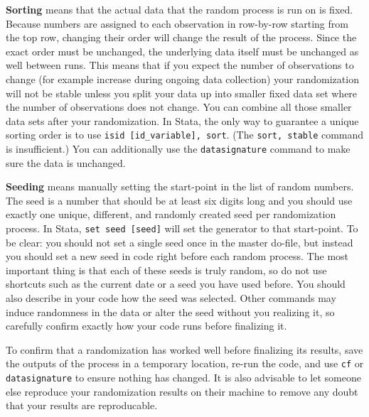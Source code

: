 \textbf{Sorting} means that the actual data that the random process is run on is fixed.
Because numbers are assigned to each observation in row-by-row starting from
the top row,
changing their order will change the result of the process.
Since the exact order must be unchanged, the underlying data itself must be unchanged as well between runs.
This means that if you expect the number of observations to change (for example increase during
ongoing data collection) your randomization will not be stable unless you split your data up into
smaller fixed data set where the number of observations does not change. You can combine all
those smaller data sets after your randomization.
In Stata, the only way to guarantee a unique sorting order is to use
\texttt{isid [id\_variable], sort}. (The \texttt{sort, stable} command is insufficient.)
You can additionally use the \texttt{datasignature} command to make sure the
data is unchanged.

\textbf{Seeding} means manually setting the start-point in the list of random numbers.
The seed is a number that should be at least six digits long and you should use exactly 
one unique, different, and randomly created seed per randomization process.
In Stata, \texttt{set seed [seed]} will set the generator to that start-point.
To be clear: you should not set a single seed once in the master do-file,
but instead you should set a new seed in code right before each random process.
The most important thing is that each of these seeds is truly random,
so do not use shortcuts such as the current date or a seed you have used before.
You should also describe in your code how the seed was selected.
Other commands may induce randomness in the data or alter the seed without you realizing it,
so carefully confirm exactly how your code runs before finalizing it.


To confirm that a randomization has worked well before finalizing its results,
save the outputs of the process in a temporary location,
re-run the code, and use \texttt{cf} or \texttt{datasignature} to ensure
nothing has changed. It is also advisable to let someone else reproduce your
randomization results on their machine to remove any doubt that your results
are reproducable.

